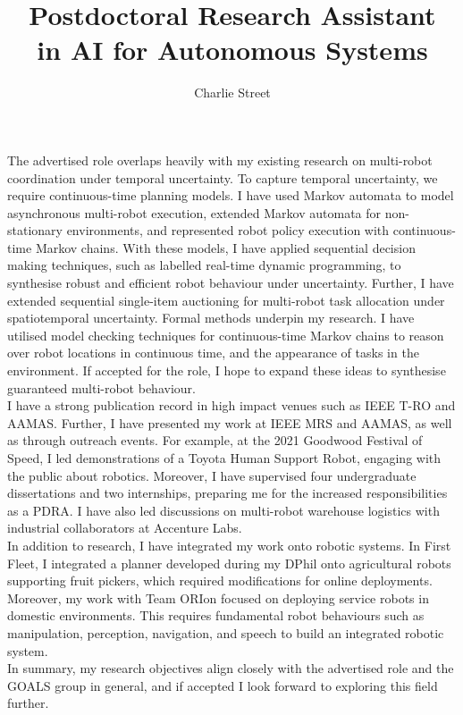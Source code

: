\documentclass[12pt]{article}
\title{Postdoctoral Research Assistant \\in AI for Autonomous Systems}
\date{}
\author{Charlie Street}
\begin{document}
\maketitle
\thispagestyle{empty}

The advertised role overlaps heavily with my existing research on multi-robot coordination under temporal uncertainty.
%
To capture temporal uncertainty, we require continuous-time planning models.
%
I have used Markov automata to model asynchronous multi-robot execution, extended Markov automata for non-stationary environments, and represented robot policy execution with continuous-time Markov chains.
%
With these models, I have applied sequential decision making techniques, such as labelled real-time dynamic programming, to synthesise robust and efficient robot behaviour under uncertainty.
%
Further, I have extended sequential single-item auctioning for multi-robot task allocation under spatiotemporal uncertainty.
%
Formal methods underpin my research.
%
I have utilised model checking techniques for continuous-time Markov chains to reason over robot locations in continuous time, and the appearance of tasks in the environment.
%
If accepted for the role, I hope to expand these ideas to synthesise guaranteed multi-robot behaviour.\\

I have a strong publication record in high impact venues such as IEEE T-RO and AAMAS.
%
Further, I have presented my work at IEEE MRS and AAMAS, as well as through outreach events.
%
For example, at the 2021 Goodwood Festival of Speed, I led demonstrations of a Toyota Human Support Robot, engaging with the public about robotics.
%
Moreover, I have supervised four undergraduate dissertations and two internships, preparing me for the increased responsibilities as a PDRA.
%
I have also led discussions on multi-robot warehouse logistics with industrial collaborators at Accenture Labs.\\

In addition to research, I have integrated my work onto robotic systems.
%
In First Fleet, I integrated a planner developed during my DPhil onto agricultural robots supporting fruit pickers, which required modifications for online deployments.
%
Moreover, my work with Team ORIon focused on deploying service robots in domestic environments.
%
This requires fundamental robot behaviours such as manipulation, perception, navigation, and speech to build an integrated robotic system.\\

In summary, my research objectives align closely with the advertised role and the GOALS group in general, and if accepted I look forward to exploring this field further.
\end{document}
